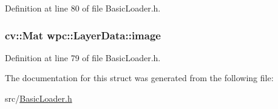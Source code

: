 Definition at line 80 of file Basic\-Loader.\-h.

\hypertarget{structwpc_1_1_layer_data_a6263b31eeab61d18b2d0089b97c6bcc9}{
\subsubsection[{image}]{\setlength{\rightskip}{0pt plus 5cm}cv\-::\-Mat wpc\-::\-Layer\-Data\-::image}}\label{structwpc_1_1_layer_data_a6263b31eeab61d18b2d0089b97c6bcc9}


Definition at line 79 of file Basic\-Loader.\-h.



The documentation for this struct was generated from the following file\-:\begin{DoxyCompactItemize}
\item 
src/\hyperlink{_basic_loader_8h}{Basic\-Loader.\-h}\end{DoxyCompactItemize}
